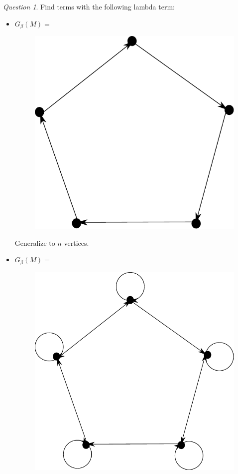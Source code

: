 \documentclass[11pt]{article}
\theoremstyle{definition}
\theoremstyle{remark}
\theoremstyle{remark}
\newtheorem{question}{Question}
\theoremstyle{definition}
\begin{document}
\begin{question}
  Find terms with the following lambda term:
  \begin{itemize}
    \item $G_\beta(M) =$
          \begin{figure}[H]
            \centering
            \includegraphics[scale=0.5]{../graphs/exercise-3-5-2-i.pdf}
          \end{figure}
          Generalize to $n$ vertices.

    \item $G_\beta(M) = $
          \begin{figure}[H]
            \centering
            \includegraphics[scale=0.5]{../graphs/exercise-3-5-2-ii.pdf}
          \end{figure}


\end{itemize}
\end{question}
\end{document}
